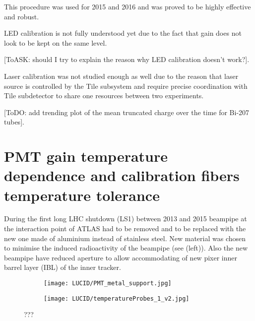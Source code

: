 This procedure was used for 2015 and 2016 and was proved to be highly effective and robust.

LED calibration is not fully understood yet due to the fact that gain does not look to be kept on the same level.

[ToASK: should I try to explain the reason why LED calibration doesn't work?].

Laser calibration was not studied enough as well due to the reason that laser source is controlled by the Tile subsystem and require 
precise coordination with Tile subdetector to share one resources between two experiments.

[ToDO: add trending plot of the mean truncated charge over the time for Bi-207 tubes].




% 
% 


\section{PMT gain temperature dependence and calibration fibers temperature tolerance}
\label{sec:tempMeas}

During the first long LHC shutdown (LS1) between 2013 and 2015 beampipe at the interaction point of ATLAS
had to be removed and to be replaced with the new one made of aluminium instead of stainless steel.
New material was chosen to minimise the induced radioactivity of the beampipe (see  (left)).
Also the new beampipe have reduced aperture to allow accommodating of new pixer inner barrel layer (IBL) of the inner tracker.

\begin{figure}
\centering
\begin{subfigure}{.6\textwidth}
  \centering
  \texttt{[image: LUCID/PMT\_metal\_support.jpg]}
\end{subfigure}%
\begin{subfigure}{.4\textwidth}
  \centering
  \texttt{[image: LUCID/temperatureProbes\_1\_v2.jpg]}
\end{subfigure}
\caption{???}
\label{fig:metalSupportAndTempProbes}
\end{figure}


